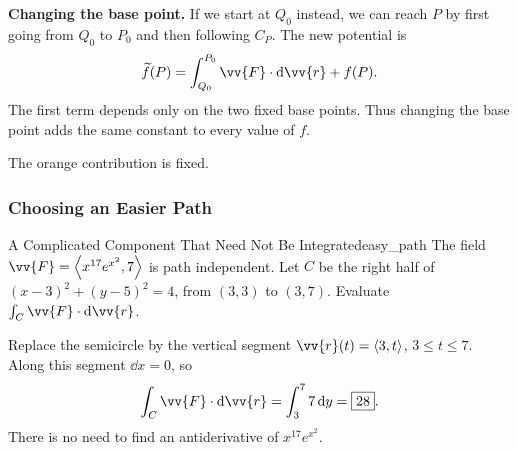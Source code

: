 \noindent\begin{minipage}[c]{0.62\linewidth}
\textbf{Changing the base point.}
If we start at $Q_0$ instead, we can reach $P$ by first going from $Q_0$
to $P_0$ and then following $C_P$. The new potential is
\[
    \widetilde f(P)
    = \int_{Q_0}^{P_0}\vv{F}\cdot\dd{\vv{r}} + f(P).
\]
The first term depends only on the two fixed base points. Thus changing
the base point adds the same constant to every value of $f$.
\end{minipage}\hfill
\begin{minipage}[c]{0.34\linewidth}
\centering\small
{}\par\smallskip
The orange contribution is fixed.
\end{minipage}\par

\newpage
\subsubsection{Choosing an Easier Path}
\begin{problem}{A Complicated Component That Need Not Be Integrated}{easy_path}
The field $\vv{F} = \ang{x^{17}e^{x^2},7}$ is path independent. Let $C$ be the right half of $(x - 3)^2 + (y - 5)^2 = 4$, from $(3,3)$ to $(3,7)$. Evaluate $\int_C\vv{F}\cdot\dd{\vv{r}}$.
\end{problem}
\begin{sol}
Replace the semicircle by the vertical segment $\vv{r}(t) = \ang{3,t}$, $3 \le t \le 7$. Along this segment $\dd{x} = 0$, so
\[
    \int_C\vv{F}\cdot\dd{\vv{r}}
    = \int_3^7 7\,\dd{y} = \boxed{28}.
\]
There is no need to find an antiderivative of $x^{17}e^{x^2}$.
\end{sol}
\begin{center}
\end{center}

